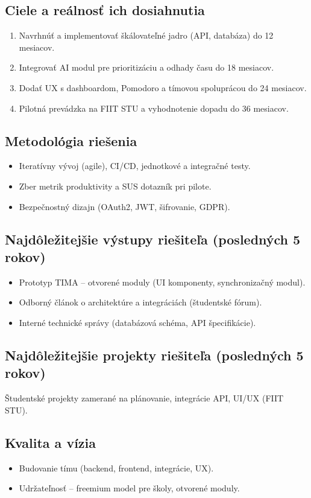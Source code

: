 \documentclass[11pt,a4paper]{article}
\begin{document}
\subsection{Ciele a reálnosť ich dosiahnutia}
\begin{enumerate}
\item Navrhnúť a implementovať škálovateľné jadro (API, databáza) do 12 mesiacov.
\item Integrovať AI modul pre prioritizáciu a odhady času do 18 mesiacov.
\item Dodať UX s dashboardom, Pomodoro a tímovou spoluprácou do 24 mesiacov.
\item Pilotná prevádzka na FIIT STU a vyhodnotenie dopadu do 36 mesiacov.
\end{enumerate}

\subsection{Metodológia riešenia}
\begin{itemize}
\item Iteratívny vývoj (agile), CI/CD, jednotkové a integračné testy.
\item Zber metrik produktivity a SUS dotazník pri pilote.
\item Bezpečnostný dizajn (OAuth2, JWT, šifrovanie, GDPR).
\end{itemize}

\subsection{Najdôležitejšie výstupy riešiteľa (posledných 5 rokov)} 
\begin{itemize}
\item Prototyp TIMA – otvorené moduly (UI komponenty, synchronizačný modul).
\item Odborný článok o architektúre a integráciách (študentské fórum).
\item Interné technické správy (databázová schéma, API špecifikácie).
\end{itemize}

\subsection{Najdôležitejšie projekty riešiteľa (posledných 5 rokov)}
Študentské projekty zamerané na plánovanie, integrácie API, UI/UX (FIIT STU).

\subsection{Kvalita a vízia}
\begin{itemize}
\item Budovanie tímu (backend, frontend, integrácie, UX).
\item Udržateľnosť – freemium model pre školy, otvorené moduly.
\end{itemize}
\end{document}
